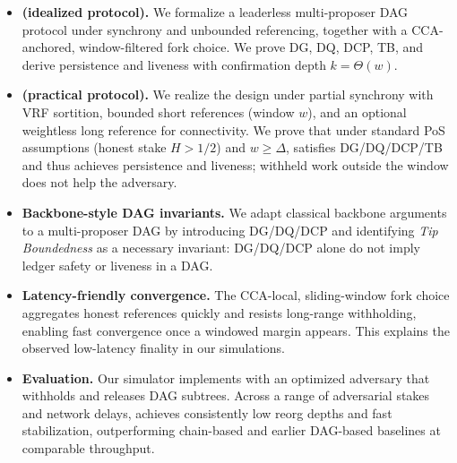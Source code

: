\begin{itemize}
	\item \textbf{\ProjIdeal (idealized protocol).} We formalize a leaderless multi-proposer DAG protocol under synchrony and unbounded referencing, together with a CCA-anchored, window-filtered fork choice. We prove DG, DQ, DCP, TB, and derive persistence and liveness with confirmation depth $k = \Theta(w)$.
	\item \textbf{\ProjBase (practical protocol).} We realize the design under partial synchrony with VRF sortition, bounded short references (window $w$), and an optional weightless long reference for connectivity. We prove that under standard PoS assumptions (honest stake $H>1/2$) and $w \ge \Delta$, \ProjBase satisfies DG/DQ/DCP/TB and thus achieves persistence and liveness; withheld work outside the window does not help the adversary.
	\item \textbf{Backbone-style DAG invariants.} We adapt classical backbone arguments to a multi-proposer DAG by introducing DG/DQ/DCP and identifying \emph{Tip Boundedness} as a necessary invariant: DG/DQ/DCP alone do not imply ledger safety or liveness in a DAG.
	\item \textbf{Latency-friendly convergence.} The CCA-local, sliding-window fork choice aggregates honest references quickly and resists long-range withholding, enabling fast convergence once a windowed margin appears. This explains the observed low-latency finality in our simulations.
	\item \textbf{Evaluation.} Our simulator implements \ProjBase with an optimized adversary that withholds and releases DAG subtrees. Across a range of adversarial stakes and network delays, \Proj achieves consistently low reorg depths and fast stabilization, outperforming chain-based and earlier DAG-based baselines at comparable throughput.
\end{itemize}

